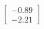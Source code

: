 \documentclass[preview]{standalone}
\begin{document}
\begin{align*}
\begin{bmatrix} -0.89 \\ -2.21 \end{bmatrix}
\end{align*}
\end{document}
